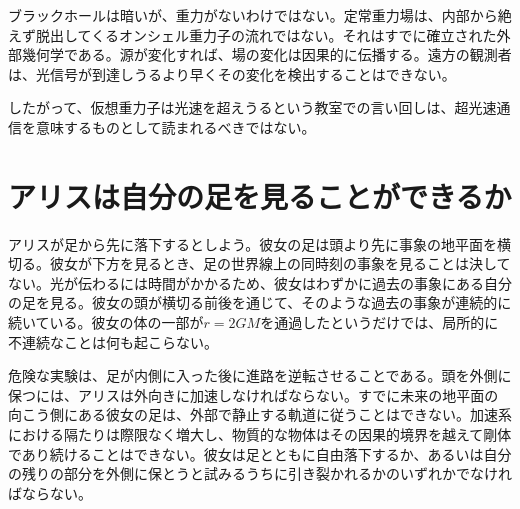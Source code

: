 ブラックホールは暗いが、重力がないわけではない。定常重力場は、内部から絶えず脱出してくるオンシェル重力子の流れではない。それはすでに確立された外部幾何学である。源が変化すれば、場の変化は因果的に伝播する。遠方の観測者は、光信号が到達しうるより早くその変化を検出することはできない。

\begin{classroomqa}
\end{classroomqa}

\begin{classroomqa}
\end{classroomqa}

したがって、仮想重力子は光速を超えうるという教室での言い回しは、超光速通信を意味するものとして読まれるべきではない。

\section{アリスは自分の足を見ることができるか}

アリスが足から先に落下するとしよう。彼女の足は頭より先に事象の地平面を横切る。彼女が下方を見るとき、足の世界線上の同時刻の事象を見ることは決してない。光が伝わるには時間がかかるため、彼女はわずかに過去の事象にある自分の足を見る。彼女の頭が横切る前後を通じて、そのような過去の事象が連続的に続いている。彼女の体の一部が\(r=2GM\)を通過したというだけでは、局所的に不連続なことは何も起こらない。

危険な実験は、足が内側に入った後に進路を逆転させることである。頭を外側に保つには、アリスは外向きに加速しなければならない。すでに未来の地平面の向こう側にある彼女の足は、外部で静止する軌道に従うことはできない。加速系における隔たりは際限なく増大し、物質的な物体はその因果的境界を越えて剛体であり続けることはできない。彼女は足とともに自由落下するか、あるいは自分の残りの部分を外側に保とうと試みるうちに引き裂かれるかのいずれかでなければならない。

